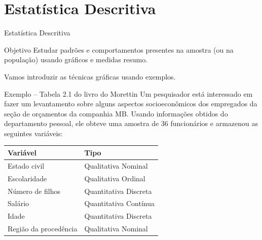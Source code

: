 \documentclass[9pt]{beamer}
\begin{document}
\begin{frame}{}
 \begin{figure}
  \centering
 \end{figure}
\end{frame}

\section{Estatística Descritiva}

\begin{frame}{Estatística Descritiva}
\begin{block}{Objetivo}
	Estudar padrões e comportamentos presentes na amostra (ou na população) usando gráficos e medidas resumo.
\end{block}

Vamos introduzir as técnicas gráficas usando exemplos.

\begin{block}{Exemplo -- Tabela 2.1 do livro do Morettin}
	Um pesquisador está interessado em fazer um levantamento sobre alguns aspectos socioeconômicos dos empregados da seção de orçamentos da companhia MB. Usando informações obtidos do departamento 
	pessoal, ele obteve uma amostra de 36 funcionários e armazenou as seguintes variáveis:
	\begin{table}
		\centering
		\begin{tabular}{ll}
			\toprule[0.05cm]
			Variável  & Tipo\\
			\midrule[0.05cm]
			Estado civil &  Qualitativa Nominal\\
			Escolaridade & Qualitativa Ordinal\\
			Número de filhos &  Quantitativa Discreta\\
			Salário &  Quantitativa Contínua\\
			Idade &  Quantitativa Discreta\\
			Região da procedência &  Qualitativa Nominal\\ \bottomrule[0.05cm]
		\end{tabular}
	\end{table}
\end{block} 
\end{frame}
\end{document}

